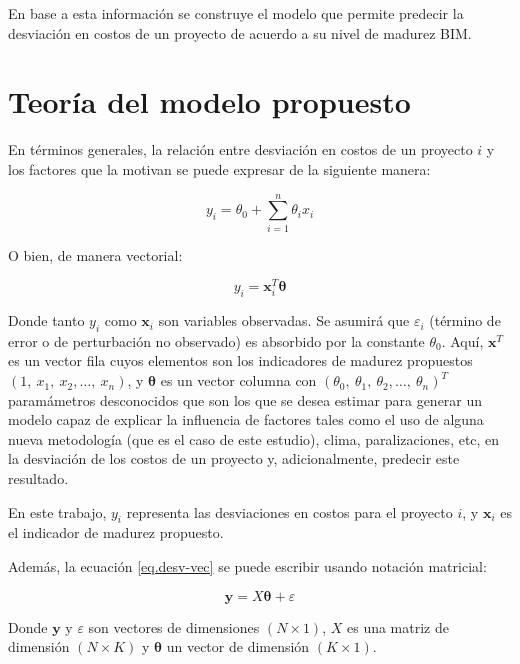 En base a esta información se construye el modelo que permite predecir la desviación en costos de un proyecto de acuerdo a su nivel de madurez BIM.

\section{Teoría del modelo propuesto}

En términos generales, la relación entre desviación en costos de un proyecto $i$ y los factores que la motivan se puede expresar de la siguiente manera:

\begin{equation}
    \label{eq.desv-gen}
    y_i = \theta_0 +\sum\limits_{i=1}^n \theta_i x_i
\end{equation}

O bien, de manera vectorial:

\begin{equation}
    \label{eq.desv-vec}
    y_i = \bm{x}^T_i\bm{\theta}
\end{equation}

Donde tanto $y_i$ como $\bm{x}_i$ son variables observadas. Se asumirá que $\varepsilon_i$ (término de error o de perturbación no observado) es absorbido por la constante $\theta_0$. Aquí, $\bm{x}^T$ es un vector fila cuyos elementos son los indicadores de madurez propuestos $(1,~x_1,~x_2,\ldots,~x_n)$, y $\bm{\theta}$ es un vector columna con $(\theta_0,~\theta_1,~\theta_2,\ldots,~\theta_n)^T$  paramámetros desconocidos que son los que se desea estimar para generar un modelo capaz de explicar la influencia de factores tales como el uso de alguna nueva metodología (que es el caso de este estudio), clima, paralizaciones, etc, en la desviación de los costos de un proyecto y, adicionalmente, predecir este resultado.

En este trabajo, $y_i$ representa las desviaciones en costos para el proyecto $i$, y $\bm{x}_i$ es el indicador de madurez propuesto.


Además, la ecuación \eqref{eq.desv-vec} se puede escribir usando notación matricial:

\begin{equation}
    \label{eq.matrix}
    \bm{y} = X\bm{\theta} + \varepsilon
\end{equation}

Donde $\bm{y}$ y $\varepsilon$ son vectores de dimensiones $(N\times1)$, $X$ es una matriz de dimensión $(N\times K)$ y $\bm{\theta}$ un vector de dimensión $(K\times1)$.

